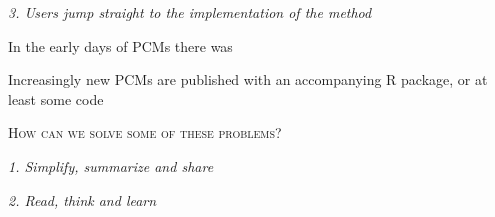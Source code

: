 \documentclass[a4paper,12pt]{article}
\renewcommand{\section}[1]{
  \bigskip
  \begin{center}
  \begin{Large}
  \normalfont\scshape #1
  \medskip
  \end{Large}
  \end{center}
}
\renewcommand{\subsection}[1]{
  \bigskip
  \begin{center}
  \begin{large}
  \normalfont\itshape #1
  \end{large}
  \end{center}
}
\begin{document}
\subsection{3. Users jump straight to the implementation of the method}

In the early days of PCMs there was


Increasingly new PCMs are published with an accompanying R package, or at least some code






\section{How can we solve some of these problems?}

\subsection{1. Simplify, summarize and share}
\subsection{2. Read, think and learn}
\end{document}

